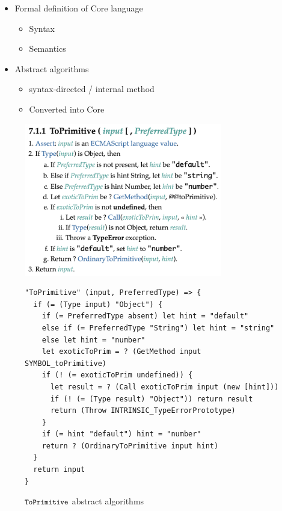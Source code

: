 {\begin{itemize}
  \item Formal definition of Core language
    \begin{itemize}
      \item Syntax
      \item Semantics
    \end{itemize}
  \item Abstract algorithms
    \begin{itemize}
      \item syntax-directed / internal method
      \item Converted into Core
    \end{itemize}
\end{itemize}
}

\begin{figure}
  \centering
  \includegraphics[height=18em]{img/to_primitive.png}
  \begin{lstlisting}[style=myCorestyle]
"ToPrimitive" (input, PreferredType) => {
  if (= (Type input) "Object") {
    if (= PreferredType absent) let hint = "default"
    else if (= PreferredType "String") let hint = "string"
    else let hint = "number"
    let exoticToPrim = ? (GetMethod input SYMBOL_toPrimitive)
    if (! (= exoticToPrim undefined)) {
      let result = ? (Call exoticToPrim input (new [hint]))
      if (! (= (Type result) "Object")) return result
      return (Throw INTRINSIC_TypeErrorPrototype)
    }
    if (= hint "default") hint = "number"
    return ? (OrdinaryToPrimitive input hint)
  }
  return input
}
  \end{lstlisting}
  \caption{\( \texttt{\small ToPrimitive} \) abstract algorithms}
  \label{fig:to-primitive}
\end{figure}

